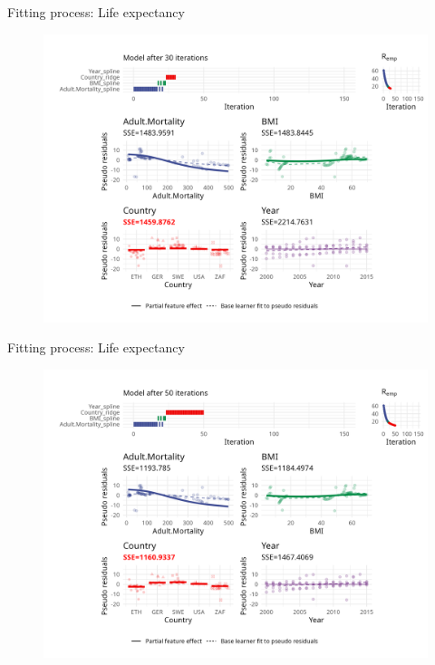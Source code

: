 \begin{frame}{Fitting process: Life expectancy}
	\begin{figure}
		\centering
		\includegraphics[width=\textwidth]{figures/cwb-anim/fig-iter-0030.png}
	\end{figure}
	\addtocounter{framenumber}{-1}
\end{frame}


\begin{frame}{Fitting process: Life expectancy}
	\begin{figure}
		\centering
		\includegraphics[width=\textwidth]{figures/cwb-anim/fig-iter-0050.png}
	\end{figure}
	\addtocounter{framenumber}{-1}
\end{frame}


